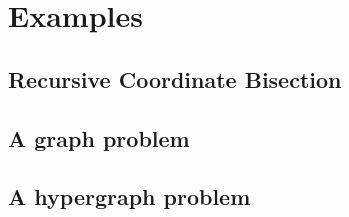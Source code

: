 %
%
\chapter{Examples}

\section{Recursive Coordinate Bisection}

\section{A graph problem}

\section{A hypergraph problem}
